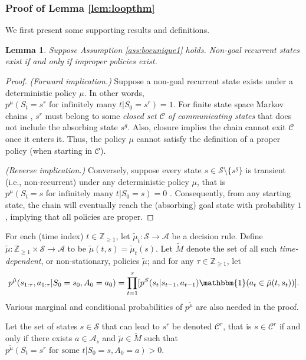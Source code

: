 \documentclass{amsart}
\newtheorem{lemma}{Lemma}
\begin{document}
 \subsubsection{Proof of Lemma \ref{lem:loopthm}}\label{apd:nondecaylkhproof}
We first present some supporting results and definitions.
 \begin{lemma}
 Suppose Assumption \ref{ass:boeunique1} holds. Non-goal recurrent states exist if and only if improper policies exist.
\label{lem:nongoalrecurstate}
 \end{lemma}
 \begin{proof}
{\it (Forward implication.)} Suppose a non-goal recurrent state exists under a deterministic policy $\mu$. In other words, $p^{\mu}(S_t=s^r \text{ for infinitely many } t|S_0=s^r)=1$. For finite state space Markov chains \citep{markovchain}, $s^r$ must belong to some {\it closed set $\mathcal{C}$ of communicating states} that does not include the absorbing state $s^g$. Also, closure implies the chain cannot exit $\mathcal{C}$ once it enters it. Thus, the policy $\mu$ cannot satisfy the definition of a proper policy (when starting in $\mathcal{C}$).


{\it (Reverse implication.)} Conversely, suppose every state $s \in \mathcal{S} \setminus \{s^g\}$ is transient (i.e., non-recurrent) under any deterministic policy $\mu$, that is $p^{\mu}(S_t=s \text{ for infinitely many } t|S_0=s)=0$ \citep{markovchain}.
Consequently, from any starting state, the chain will eventually reach the (absorbing) goal state with probability $1$ \citep{markovchain}, implying that all policies are proper.
\end{proof}

 

For each (time index) $t \in \mathbb{Z}_{\geq 1}$, let $\tilde{\mu}_t:\mathcal{S} \rightarrow \mathcal{A}$ be a decision rule. Define $\tilde{\mu}: \mathbb{Z}_{\geq 1} \times \mathcal{S} \rightarrow \mathcal{A}$ to be $\tilde{\mu}(t,s)=\tilde{\mu}_t(s)$. Let $\widetilde{M}$ denote the set of all such {\it time-dependent}, or non-stationary, policies $\tilde{\mu}$; and for any $\tau \in \mathbb{Z}_{\geq 1}$, let
$$
p^{\tilde{\mu}}(s_{1:\tau}, a_{1:\tau}|S_0=s_0, A_0=a_0)= \prod_{t=1}^{\tau}[p^S(s_t|s_{t-1},a_{t-1}) \mathbbm{1}(a_t \in \tilde{\mu}(t,s_t))].$$
Various marginal and conditional probabilities of $p^{\tilde{\mu}}$ are also needed in the proof.


Let the set of states $s \in \mathcal{S}$ that can lead to $s^r$ be denoted $\mathcal{C}^r$, that is $s\in \mathcal{C}^r $ if and only if there exists $a \in \mathcal{A}_s$ and $\tilde{\mu} \in \widetilde{M}$ such that 
$p^{\tilde{\mu}}(S_t=s^r \text{ for some } t | S_0=s, A_0=a) >0$.
\end{document}
